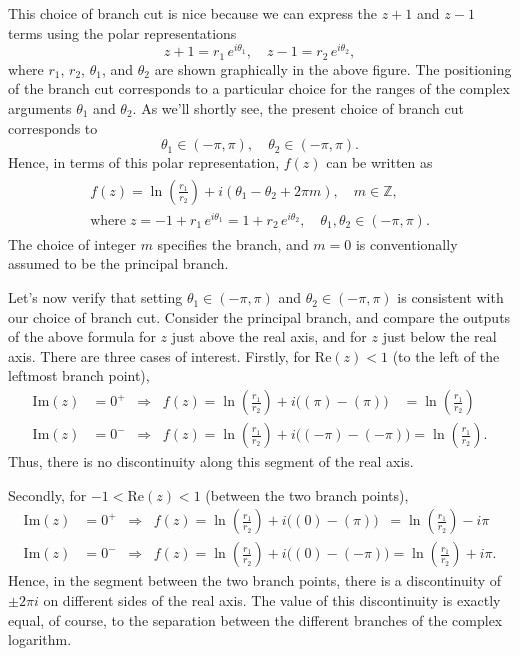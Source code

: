 \documentclass[10pt,a4paper]{article}
\begin{document}
This choice of branch cut is nice because we can express the $z+1$ and
$z - 1$ terms using the polar representations
\begin{equation}
z + 1 = r_1\,e^{i\theta_1}, \quad z - 1 = r_2\, e^{i\theta_2},
\end{equation}
where $r_1$, $r_2$, $\theta_1$, and $\theta_2$ are shown
graphically in the above figure. The positioning of the branch cut
corresponds to a particular choice for the ranges of the complex
arguments $\theta_1$ and $\theta_2$. As we'll shortly see, the
present choice of branch cut corresponds to
\begin{equation}
\theta_1 \in (-\pi,\pi), \quad \theta_2 \in (-\pi,\pi).
\end{equation}
Hence, in terms of this polar representation, $f(z)$ can be written as
\begin{align}
  \begin{aligned}
    f(z) = \ln\left(\frac{r_1}{r_2}\right) + i(\theta_1 - \theta_2 + 2\pi m), \quad m\in\mathbb{Z}, \\
    \mathrm{where}\; z = -1 + r_1\,e^{i\theta_1} = 1 + r_2\,e^{i\theta_2},\quad\theta_1, \theta_2 \in (-\pi,\pi).
  \end{aligned}
\end{align}
The choice of integer $m$ specifies the branch, and $m = 0$ is
conventionally assumed to be the principal branch.

Let's now verify that setting $\theta_1 \in (-\pi,\pi)$ and
$\theta_2 \in (-\pi,\pi)$ is consistent with our choice of branch cut.
Consider the principal branch, and compare the outputs of the above
formula for $z$ just above the real axis, and for $z$ just below the
real axis. There are three cases of interest. Firstly, for
$\mathrm{Re}(z) < 1$ (to the left of the leftmost branch point),
\begin{align}
  \mathrm{Im}(z) &= 0^+ \;\;\Rightarrow\;\; f(z) = \ln\left(\frac{r_1}{r_2}\right) + i\Big((\pi) - (\pi)\Big) \quad = \ln\left(\frac{r_1}{r_2}\right) \\ \mathrm{Im}(z) &= 0^- \;\;\Rightarrow \;\; f(z) = \ln\left(\frac{r_1}{r_2}\right) + i\Big((-\pi) - (-\pi)\Big) = \ln\left(\frac{r_1}{r_2}\right).
\end{align}
Thus, there is no discontinuity along this segment of the real axis.

Secondly, for $-1 < \mathrm{Re}(z) < 1$ (between the two branch
points),
\begin{align}
  \mathrm{Im}(z) &= 0^+ \;\;\Rightarrow\;\; f(z) = \ln\left(\frac{r_1}{r_2}\right) + i\Big((0) - (\pi)\Big) \;\;= \ln\left(\frac{r_1}{r_2}\right) -i\pi \\ \mathrm{Im}(z) &= 0^- \;\;\Rightarrow\;\; f(z) = \ln\left(\frac{r_1}{r_2}\right) + i\Big((0) - (-\pi)\Big) = \ln\left(\frac{r_1}{r_2}\right) + i\pi.
\end{align}
Hence, in the segment between the two branch points, there is a
discontinuity of $\pm 2\pi i$ on different sides of the real axis. The
value of this discontinuity is exactly equal, of course, to the
separation between the different branches of the complex logarithm.
\end{document}
